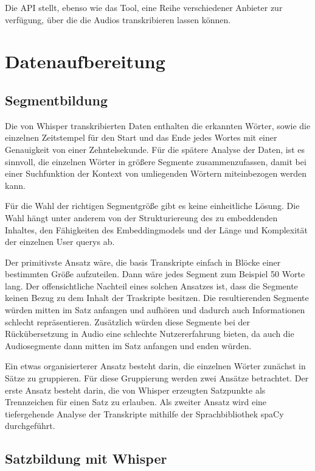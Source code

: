 Die API stellt, ebenso wie das Tool, eine Reihe verschiedener Anbieter zur verfügung, über die die Audios transkribieren lassen können. 

\section{Datenaufbereitung}

\subsection{Segmentbildung}

Die von Whisper transkribierten Daten enthalten die erkannten Wörter, sowie die einzelnen Zeitstempel für den Start und das Ende jedes Wortes mit einer Genauigkeit von einer Zehntelsekunde.
Für die spätere Analyse der Daten, ist es sinnvoll, die einzelnen Wörter in größere Segmente zusammenzufassen, damit bei einer Suchfunktion der Kontext von umliegenden Wörtern miteinbezogen werden kann.

Für die Wahl der richtigen Segmentgröße gibt es keine einheitliche Lösung.
Die Wahl hängt unter anderem von der Strukturiereung des zu embeddenden Inhaltes, den Fähigkeiten des Embeddingmodels und der Länge und Komplexität der einzelnen User querys ab.

Der primitivste Ansatz wäre, die basis Transkripte einfach in Blöcke einer bestimmten Größe aufzuteilen.
Dann wäre jedes Segment zum Beispiel 50 Worte lang.
Der offensichtliche Nachteil eines solchen Ansatzes ist, dass die Segmente keinen Bezug zu dem Inhalt der Traskripte besitzen.
Die resultierenden Segmente würden mitten im Satz anfangen und aufhören und dadurch auch Informationen schlecht repräsentieren.
Zusätzlich würden diese Segmente bei der Rückübersetzung in Audio eine schlechte Nutzererfahrung bieten, da auch die Audiosegmente dann mitten im Satz anfangen und enden würden.  

Ein etwas organisierterer Ansatz besteht darin, die einzelnen Wörter zunächst in Sätze zu gruppieren.
Für diese Gruppierung werden zwei Ansätze betrachtet.
Der erste Ansatz besteht darin, die von Whisper erzeugten Satzpunkte als  Trennzeichen für einen Satz zu erlauben.
Als zweiter Ansatz wird eine tiefergehende Analyse der Transkripte mithilfe der Sprachbibliothek spaCy durchgeführt.

\subsection{Satzbildung mit Whisper}

